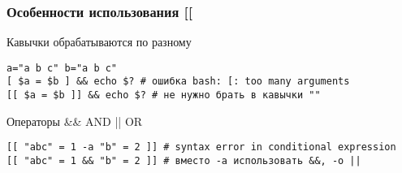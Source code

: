 \begin{frame}[fragile]
    \frametitle{ Особенности использования [[ }
    \begin{block}{Кавычки обрабатываются по разному}
	\small\begin{lstlisting}
a="a b c" b="a b c"
[ $a = $b ] && echo $? # ошибка bash: [: too many arguments
[[ $a = $b ]] && echo $? # не нужно брать в кавычки ""
	\end{lstlisting}
    \end{block}

    \begin{block}{ Операторы \&\& AND || OR }
	\small\begin{lstlisting}
[[ "abc" = 1 -a "b" = 2 ]] # syntax error in conditional expression
[[ "abc" = 1 && "b" = 2 ]] # вместо -a использовать &&, -o ||
	\end{lstlisting}
    \end{block}
\end{frame}
